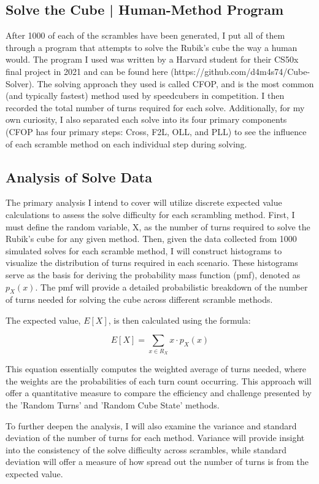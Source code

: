 \documentclass[12pt,letterpaper]{article}
\numberwithin{equation}{section}
\begin{document}
\subsection{Solve the Cube | Human-Method Program}
After 1000 of each of the scrambles have been generated, I put all of them through a program that attempts to solve the Rubik's cube the way a human would. The program I used was written by a Harvard student for their CS50x final project in 2021 and can be found here (https://github.com/d4m4s74/Cube-Solver). The solving approach they used is called CFOP, and is the most common (and typically fastest) method used by speedcubers in competition. I then recorded the total number of turns required for each solve. Additionally, for my own curiosity, I also separated each solve into its four primary components (CFOP has four primary steps: Cross, F2L, OLL, and PLL) to see the influence of each scramble method on each individual step during solving. 

\subsection{Analysis of Solve Data}
The primary analysis I intend to cover will utilize discrete expected value calculations to assess the solve difficulty for each scrambling method. First, I must define the random variable, X, as the number of turns required to solve the Rubik's cube for any given method. Then, given the data collected from 1000 simulated solves for each scramble method, I will construct histograms to visualize the distribution of turns required in each scenario. These histograms serve as the basis for deriving the probability mass function (pmf), denoted as $p_X(x)$. The pmf will provide a detailed probabilistic breakdown of the number of turns needed for solving the cube across different scramble methods.

The expected value, $E[X]$, is then calculated using the formula:

\begin{equation}
E[X] = \sum_{x \in R_X} x \cdot p_X(x)
\end{equation}

This equation essentially computes the weighted average of turns needed, where the weights are the probabilities of each turn count occurring. This approach will offer a quantitative measure to compare the efficiency and challenge presented by the 'Random Turns' and 'Random Cube State' methods.

To further deepen the analysis, I will also examine the variance and standard deviation of the number of turns for each method. Variance will provide insight into the consistency of the solve difficulty across scrambles, while standard deviation will offer a measure of how spread out the number of turns is from the expected value. 
\end{document}
